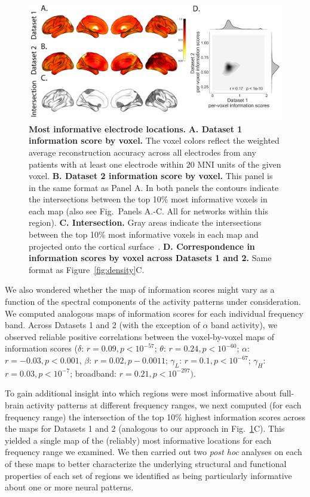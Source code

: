 \documentclass[11pt]{article}
\begin{document}
\begin{figure}
  \centering
  \includegraphics[width=\textwidth]{figs/informap}
  \caption{\textbf{Most informative electrode locations.}
    \textbf{A. Dataset 1 information score by voxel.} The voxel colors
    reflect the weighted average reconstruction accuracy across all
    electrodes from any patients with at least one electrode within 20
    MNI units of the given voxel.  \textbf{B. Dataset 2 information
      score by voxel.}  This panel is in the same format as Panel A.
    In both panels the contours indicate the intersections between the
    top 10\% most informative voxels in each map (also see
    Fig.~\networks Panels A.-C. All for networks within this region).  \textbf{C. Intersection.}
    Gray areas indicate the intersections between the
    top 10\% most informative voxels in each map and projected onto the cortical surface~\citep{CombEtal19}. \textbf{D. Correspondence in information
      scores by voxel across Datasets 1 and 2.}  Same format as
    Figure~\ref{fig:density}C.}
  \label{fig:informap}
\end{figure}

We also wondered whether the map of information scores might vary as a function
of the spectral components of the activity patterns under consideration.  We
computed analogous maps of information scores for each individual frequency
band. Across Datasets 1 and 2 (with the exception of $\alpha$ band activity), we
observed reliable positive correlations between the voxel-by-voxel maps of
information scores ($\delta$: $r = 0.09, p < 10^{-57}$; $\theta$: $r = 0.24, p <
10^{-60}$; $\alpha$: $r = -0.03, p < 0.001$, $\beta$: $r = 0.02, p - 0.0011$;
$\gamma_L$: $r = 0.1, p < 10^{-67}$; $\gamma_H$: $r = 0.03, p < 10^{-7}$;
broadband: $r = 0.21, p < 10^{-297})$.

To gain additional insight into which regions were most informative about
full-brain activity patterns at different frequency ranges, we next computed
(for each frequency range) the intersection of the top 10\% highest information
scores across the maps for Datasets 1 and 2 (analogous to our approach in
Fig.~\ref{fig:informap}C). This yielded a single map of the (reliably) most
informative locations for each frequency range we examined. We then carried out
two \textit{post hoc} analyses on each of these maps to better characterize the
underlying structural and functional properties of each set of regions we
identified as being particularly informative about one or more neural patterns.
\end{document}
